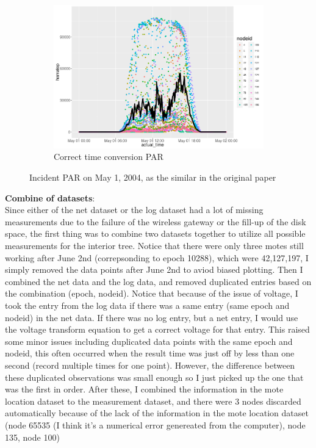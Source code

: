 \documentclass[11pt]{article}
\begin{document}
{\begin{figure}[H]
\begin{subfigure}{.5\textwidth}
\includegraphics[width=0.95\linewidth]{correct_time_conversion.png}
\caption{Correct time conversion PAR}
\label{fig:correctTime}
\end{subfigure}
\caption{Incident PAR on May 1, 2004, as the similar in the original paper}
\end{figure}%
\textbf{Combine of datasets}:\\
Since either of the net dataset or the log dataset had a lot of missing measurements due to the failure of the wireless gateway or the fill-up of the disk space, the first thing was to combine two datasets together to utilize all possible measurements for the interior tree. Notice that there were only three motes still working after June 2nd (correpsonding to epoch 10288), which were 42,127,197, I simply removed the data points after June 2nd to aviod biased plotting. Then I combined the net data and the log data, and removed duplicated entries based on the combination (epoch, nodeid). Notice that because of the issue of voltage, I took the entry from the log data if there was a same entry (same epoch and nodeid) in the net data. If there was no log entry, but a net entry, I would use the voltage transform equation to get a correct voltage for that entry. This raised some minor issues including duplicated data points with the same epoch and nodeid, this often occurred when the result time was just off by less than one second (record multiple times for one point). However, the difference between these duplicated observations was small enough so I just picked up the one that was the first in order. After these, I combined the information in the mote location dataset to the measurement dataset, and there were 3 nodes discarded automatically because of the lack of the information in the mote location dataset (node 65535 (I think it's a numerical error genereated from the computer), node 135, node 100)
}
\end{document}
